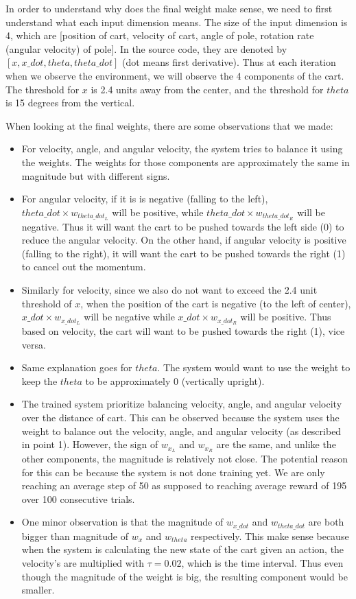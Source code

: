 \documentclass[11pt,twoside]{article}
\begin{document}
In order to understand why does the final weight make sense, we need to first understand what each input dimension means. The size of the input dimension is 4, which are [position of cart, velocity of cart, angle of pole, rotation rate (angular velocity) of pole]. In the source code, they are denoted by $[x, x\_dot, theta, theta\_dot]$ (dot means first derivative). Thus at each iteration when we observe the environment, we will observe the 4 components of the cart. The threshold for $x$ is 2.4 units away from the center, and the threshold for $theta$ is 15 degrees from the vertical.

When looking at the final weights, there are some observations that we made:
\begin {itemize}
	\item For velocity, angle, and angular velocity, the system tries to balance it using the weights. The weights for those components are approximately the same in magnitude but with different signs.
	\item For angular velocity, if it is is negative (falling to the left), $theta\_dot \times w_{theta\_dot_L}$ will be positive, while $theta\_dot \times w_{theta\_dot_R}$ will be negative. Thus it will want the cart to be pushed towards the left side (0) to reduce the angular velocity. On the other hand, if angular velocity is positive (falling to the right), it will want the cart to be pushed towards the right (1) to cancel out the momentum.
	\item Similarly for velocity, since we also do not want to exceed the 2.4 unit threshold of $x$, when the position of the cart is negative (to the left of center), $x\_dot \times w_{x\_dot_L}$ will be negative while $x\_dot \times w_{x\_dot_R}$ will be positive. Thus based on velocity, the cart will want to be pushed towards the right (1), vice versa.
	\item Same explanation goes for $theta$. The system would want to use the weight to keep the $theta$ to be approximately 0 (vertically upright).
	\item The trained system prioritize balancing velocity, angle, and angular velocity over the distance of cart. This can be observed because the system uses the weight to balance out the velocity, angle, and angular velocity (as described in point 1). However, the sign of $w_{x_L}$ and $w_{x_R}$ are the same, and unlike the other components, the magnitude is relatively not close. The potential reason for this can be because the system is not done training yet. We are only reaching an average step of 50 as supposed to reaching average reward of 195 over 100 consecutive trials.
	\item One minor observation is that the magnitude of $w_{x\_dot}$ and $w_{theta\_dot}$ are both bigger than magnitude of $w_x$ and $w_{theta}$ respectively. This make sense because when the system is calculating the new state of the cart given an action, the velocity's are multiplied with $\tau=0.02$, which is the time interval. Thus even though the magnitude of the weight is big, the resulting component would be smaller.
\end {itemize}

\clearpage
\end{document}
